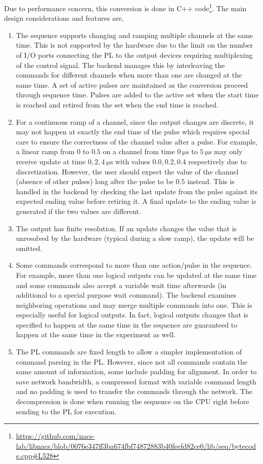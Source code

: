 Due to performance concern, this conversion is done in C++ code\footnote{\url{https://github.com/nacs-lab/libnacs/blob/0076e347ff3ba674fbf74872883b40feefd82ce0/lib/seq/bytecode.cpp\#L528}}.
The main design considerations and features are,
\begin{enumerate}
\item The sequence supports changing and ramping multiple channels at the same time.
  This is not supported by the hardware due to the limit on the number of I/O ports
  connecting the PL to the output devices requiring multiplexing of the control signal.
  The backend manages this by interleaving the commands for different channels
  when more than one are changed at the same time.
  A set of active pulses are maintained as the conversion proceed through sequence time.
  Pulses are added to the active set when the start time is reached
  and retired from the set when the end time is reached.
\item For a continuous ramp of a channel, since the output changes are discrete,
  it may not happen at exactly the end time of the pulse
  which requires special care to ensure the correctness of the channel value after a pulse.
  For example, a linear ramp from $0$ to $0.5$ on a channel from time $0~\mathrm{\mu s}$
  to $5~\mathrm{\mu s}$ may only receive update at time $0, 2, 4~\mathrm{\mu s}$
  with values $0.0, 0.2, 0.4$ respectively due to discretization.
  However, the user should expect the value of the channel (absence of other pulses)
  long after the pulse to be $0.5$ instead.
  This is handled in the backend by checking the last update from the pulse
  against its expected ending value before retiring it.
  A final update to the ending value is generated if the two values are different.
\item The output has finite resolution.
  If an update changes the value that is unresolved by the hardware
  (typical during a slow ramp), the update will be omitted.
\item Some commands correspond to more than one action/pulse in the sequence.
  For example, more than one logical outputs can be updated at the same time
  and some commands also accept a variable wait time afterwards
  (in additional to a special purpose wait command).
  The backend examines neighboring operations and may merge multiple commands into one.
  This is especially useful for logical outputs.
  In fact, logical outputs changes that is specified to happen at the same time in the sequence
  are guaranteed to happen at the same time in the experiment as well.
\item The PL commands are fixed length to allow a simpler implementation
  of command parsing in the PL.
  However, since not all commands contain the same amount of information,
  some include padding for alignment.
  In order to save network bandwidth, a compressed format with variable command length
  and no padding is used to transfer the commands through the network.
  The decompression is done when running the sequence on the CPU right before
  sending to the PL for execution.
\end{enumerate}

